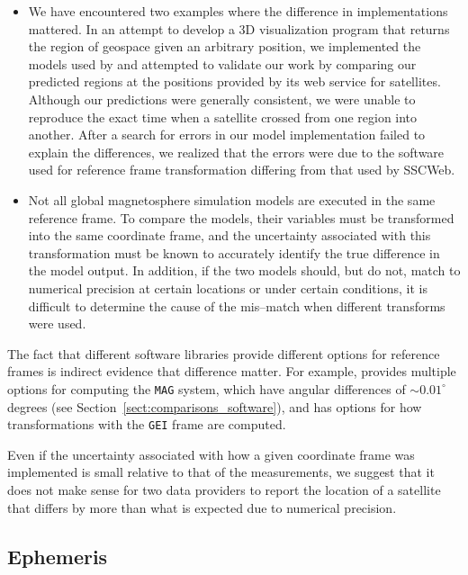 \documentclass[draft]{agujournal2019}
\begin{document}
\begin{itemize}
\item We have encountered two examples where the difference in implementations mattered. In an attempt to develop a 3D visualization program that returns the region of geospace given an arbitrary position, we implemented the models used by \cite{SSCWeb} and attempted to validate our work by comparing our predicted regions at the positions provided by its web service for satellites. Although our predictions were generally consistent, we were unable to reproduce the exact time when a satellite crossed from one region into another. After a search for errors in our model implementation failed to explain the differences, we realized that the errors were due to the software used for reference frame transformation differing from that used by SSCWeb.

\item Not all global magnetosphere simulation models are executed in the same reference frame. To compare the models, their variables must be transformed into the same coordinate frame, and the uncertainty associated with this transformation must be known to accurately identify the true difference in the model output. In addition, if the two models should, but do not, match to numerical precision at certain locations or under certain conditions, it is difficult to determine the cause of the mis--match when different transforms were used. 
\end{itemize}

The fact that different software libraries provide different options for reference frames is indirect evidence that difference matter. For example,  provides multiple options for computing the \texttt{MAG} system, which have angular differences of ${\sim}0.01^\circ$ degrees (see Section~\ref{sect:comparisons_software}), and  has options for how transformations with the \texttt{GEI} frame are computed.

Even if the uncertainty associated with how a given coordinate frame was implemented is small relative to that of the measurements, we suggest that it does not make sense for two data providers to report the location of a satellite that differs by more than what is expected due to numerical precision.

\subsection{Ephemeris}
\label{sect:comparisons_ephemeris}
\end{document}
